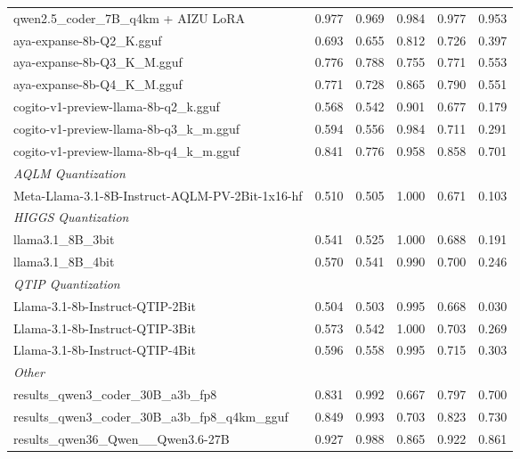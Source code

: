 \begin{table}[htbp]
{\begin{tabular}{lrrrrr}
    qwen2.5\_coder\_7B\_q4km + AIZU LoRA & 0.977 & 0.969 & 0.984 & 0.977 & \cellcolor{green!30}0.953 \\
    aya-expanse-8b-Q2\_K.gguf & 0.693 & 0.655 & 0.812 & 0.726 & 0.397 \\
    aya-expanse-8b-Q3\_K\_M.gguf & 0.776 & 0.788 & 0.755 & 0.771 & 0.553 \\
    aya-expanse-8b-Q4\_K\_M.gguf & 0.771 & 0.728 & 0.865 & 0.790 & 0.551 \\
    cogito-v1-preview-llama-8b-q2\_k.gguf & 0.568 & 0.542 & 0.901 & 0.677 & 0.179 \\
    cogito-v1-preview-llama-8b-q3\_k\_m.gguf & 0.594 & 0.556 & 0.984 & 0.711 & 0.291 \\
    cogito-v1-preview-llama-8b-q4\_k\_m.gguf & 0.841 & 0.776 & 0.958 & 0.858 & 0.701 \\
    \midrule
    \multicolumn{6}{l}{\textit{AQLM Quantization}} \\
    \midrule
    Meta-Llama-3.1-8B-Instruct-AQLM-PV-2Bit-1x16-hf & 0.510 & 0.505 & 1.000 & 0.671 & 0.103 \\
    \midrule
    \multicolumn{6}{l}{\textit{HIGGS Quantization}} \\
    \midrule
    llama3.1\_8B\_3bit & 0.541 & 0.525 & 1.000 & 0.688 & 0.191 \\
    llama3.1\_8B\_4bit & 0.570 & 0.541 & 0.990 & 0.700 & 0.246 \\
    \midrule
    \multicolumn{6}{l}{\textit{QTIP Quantization}} \\
    \midrule
    Llama-3.1-8b-Instruct-QTIP-2Bit & 0.504 & 0.503 & 0.995 & 0.668 & 0.030 \\
    Llama-3.1-8b-Instruct-QTIP-3Bit & 0.573 & 0.542 & 1.000 & 0.703 & 0.269 \\
    Llama-3.1-8b-Instruct-QTIP-4Bit & 0.596 & 0.558 & 0.995 & 0.715 & 0.303 \\
    \midrule
    \multicolumn{6}{l}{\textit{Other}} \\
    \midrule
    results\_qwen3\_coder\_30B\_a3b\_fp8 & 0.831 & 0.992 & 0.667 & 0.797 & 0.700 \\
    results\_qwen3\_coder\_30B\_a3b\_fp8\_q4km\_gguf & 0.849 & 0.993 & 0.703 & 0.823 & 0.730 \\
    results\_qwen36\_Qwen\_\_Qwen3.6-27B & 0.927 & 0.988 & 0.865 & 0.922 & 0.861 \\
    \bottomrule
  \end{tabular}
  }
\end{table}

